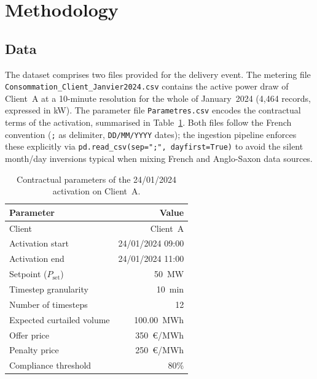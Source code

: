\documentclass{article}
\begin{document}
\section{Methodology}

\subsection{Data}
\label{sec:data}

The dataset comprises two files provided for the delivery event. The metering file \texttt{Consommation\_Client\_Janvier2024.csv} contains the active power draw of Client~A at a 10-minute resolution for the whole of January~2024 (4{,}464 records, expressed in kW). The parameter file \texttt{Parametres.csv} encodes the contractual terms of the activation, summarised in Table~\ref{tab:params}. Both files follow the French convention (\texttt{;} as delimiter, \texttt{DD/MM/YYYY} dates); the ingestion pipeline enforces these explicitly via \texttt{pd.read\_csv(sep=";", dayfirst=True)} to avoid the silent month/day inversions typical when mixing French and Anglo-Saxon data sources.

\begin{table}[H]
\centering
\begin{tabular}{@{}lr@{}}
\toprule
Parameter & Value \\ \midrule
Client                          & Client~A \\
Activation start                & 24/01/2024 09:00 \\
Activation end                  & 24/01/2024 11:00 \\
Setpoint ($P_{\text{set}}$)     & 50~MW \\
Timestep granularity            & 10~min \\
Number of timesteps             & 12 \\
Expected curtailed volume       & 100.00~MWh \\
Offer price                     & 350~\euro/MWh \\
Penalty price                   & 250~\euro/MWh \\
Compliance threshold            & 80\% \\ \bottomrule
\end{tabular}
\caption{Contractual parameters of the 24/01/2024 activation on Client~A.}
\label{tab:params}
\end{table}
\end{document}
